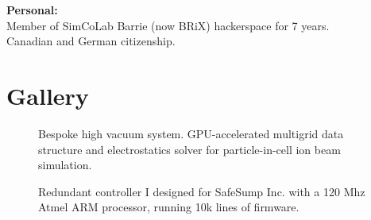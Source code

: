 \documentclass[fleqn,11pt]{article}
\begin{document}
{\begin{multicols}{1}
\begin{tcolorbox}
	\textbf{Personal:\\}
	Member of SimCoLab Barrie (now BRiX) hackerspace for 7 years.\\
	Canadian and German citizenship.
\end{tcolorbox}



\end{multicols}


\section{Gallery}
\begin{figure}[H]
	\centering
	\caption*{Bespoke high vacuum system. GPU-accelerated multigrid data structure and electrostatics solver for particle-in-cell ion beam simulation.}
	\hfill
	
\end{figure}



\begin{figure}[H]
	\centering
	\caption*{Redundant controller I designed for SafeSump Inc. with a 120 Mhz Atmel ARM processor, running \ntilde10k lines of firmware.}
	\hfill
	
\end{figure}



}
\end{document}
